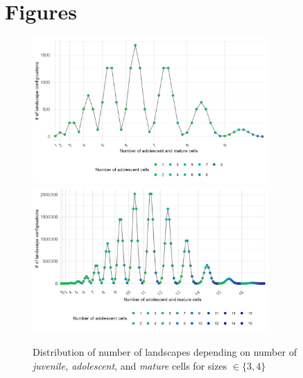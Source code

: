 \clearpage

\section{Figures}




\begin{figure}[H]
    \centering
    \includegraphics[width = 0.8\textwidth]{figures/wildland/distribution_cases_3.png}\\
    \includegraphics[width = 0.8\textwidth]{figures/wildland/distribution_cases_4.png}
    \caption{Distribution of number of landscapes depending on number of \textit{juvenile, adolescent}, and \textit{mature} cells for sizes $\in \{3,4\}$}
    \label{fig:appendix_distribution}
\end{figure}


